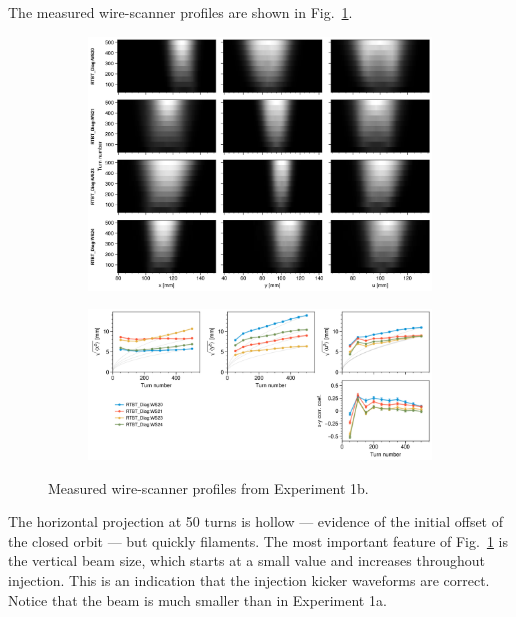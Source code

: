 The measured wire-scanner profiles are shown in Fig.~\ref{fig:exp1b_wsmeas}.
%
\begin{figure}[!p]
    \centering
    \begin{subfigure}{\textwidth}
        \includegraphics[width=\textwidth]{Images/chapter5/exp1b/waterfall.png}
    \end{subfigure}
    \vfill
    \vspace*{1.25cm}
    \vfill
    \begin{subfigure}{\textwidth}
        \includegraphics[width=\textwidth]{Images/chapter5/exp1b/rms.png}
    \end{subfigure}
    \caption{Measured wire-scanner profiles from Experiment 1b.}
    \label{fig:exp1b_wsmeas}
\end{figure}
%
The horizontal projection at 50 turns is hollow — evidence of the initial offset of the closed orbit — but quickly filaments. The most important feature of Fig.~\ref{fig:exp1b_wsmeas} is the vertical beam size, which starts at a small value and increases throughout injection. This is an indication that the injection kicker waveforms are correct. Notice that the beam is much smaller than in Experiment 1a.

